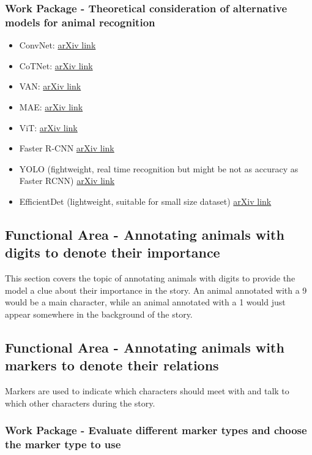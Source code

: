 \subsubsection{Work Package - Theoretical consideration of alternative models for animal recognition}
\begin{itemize}
	\item ConvNet: \href{https://arxiv.org/abs/2201.03545}{arXiv link}
	\item CoTNet: \href{https://arxiv.org/abs/2107.12292}{arXiv link}
	\item VAN: \href{https://arxiv.org/abs/2202.09741}{arXiv link}
	\item MAE: \href{https://arxiv.org/abs/2111.06377}{arXiv link}
	\item ViT: \href{https://arxiv.org/abs/2010.11929}{arXiv link}
	\item Faster R-CNN \href{https://arxiv.org/abs/1506.01497}{arXiv link}
	\item YOLO (fightweight, real time recognition but might be not as accuracy as Faster RCNN) \href{https://arxiv.org/abs/1506.02640}{arXiv link}
	\item EfficientDet (lightweight, suitable for small size dataset) \href{https://arxiv.org/abs/1911.09070}{arXiv link}
\end{itemize}

\subsection{Functional Area - Annotating animals with digits to denote their importance}
This section covers the topic of annotating animals with digits to provide the model a clue about their importance in the story. An animal annotated with a 9 would be a main character, while an animal annotated with a 1 would just appear somewhere in the background of the story.

\subsection{Functional Area - Annotating animals with markers to denote their relations}
Markers are used to indicate which characters should meet with and talk to which other characters during the story.

\subsubsection{Work Package - Evaluate different marker types and choose the marker type to use}

